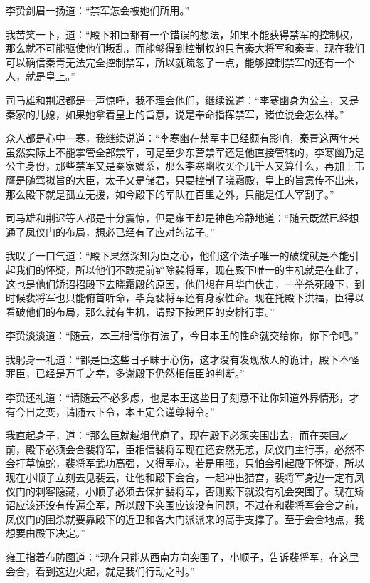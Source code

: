 李贽剑眉一扬道：“禁军怎会被她们所用。”

我苦笑一下，道：“殿下和臣都有一个错误的想法，如果不能获得禁军的控制权，那么就不可能驱使他们叛乱，而能够得到控制权的只有秦大将军和秦青，现在我们可以确信秦青无法完全控制禁军，所以就疏忽了一点，能够控制禁军的还有一个人，就是皇上。”

司马雄和荆迟都是一声惊呼，我不理会他们，继续说道：“李寒幽身为公主，又是秦家的儿媳，如果她拿着皇上的旨意，说是奉命指挥禁军，诸位说会怎么样。”

众人都是心中一寒，我继续说道：“李寒幽在禁军中已经颇有影响，秦青这两年来虽然实际上不能掌管全部禁军，可是至少东营禁军还是他直接管辖的，李寒幽乃是公主身份，那些禁军又是秦家嫡系，那么李寒幽收买个几千人又算什么，再加上韦膺是随驾拟旨的大臣，太子又是储君，只要控制了晓霜殿，皇上的旨意传不出来，那么殿下就是孤立无援，如今殿下的军队在百里之外，只能是任人宰割了。”

司马雄和荆迟等人都是十分震惊，但是雍王却是神色冷静地道：“随云既然已经想通了凤仪门的布局，想必已经有了应对的法子。”

我叹了一口气道：“殿下果然深知为臣之心，他们这个法子唯一的破绽就是不能引起我们的怀疑，所以他们不敢提前铲除裴将军，现在殿下唯一的生机就是在此了，这也是他们矫诏招殿下去晓霜殿的原因，他们想在月华门伏击，一举杀死殿下，到时候裴将军也只能俯首听命，毕竟裴将军还有身家性命。现在托殿下洪福，臣得以看破他们的布局，那么就有生机，请殿下按照臣的安排行事。”

李贽淡淡道：“随云，本王相信你有法子，今日本王的性命就交给你，你下令吧。”

我躬身一礼道：“都是臣这些日子昧于心伤，这才没有发现敌人的诡计，殿下不怪罪臣，已经是万千之幸，多谢殿下仍然相信臣的判断。”

李贽还礼道：“请随云不必多虑，也是本王这些日子刻意不让你知道外界情形，才有今日之变，请随云下令，本王定会谨尊将令。”

我直起身子，道：“那么臣就越俎代庖了，现在殿下必须突围出去，而在突围之前，殿下必须会合裴将军，臣相信裴将军现在还安然无恙，凤仪门主行事，必然不会打草惊蛇，裴将军武功高强，又得军心，若是用强，只怕会引起殿下怀疑，所以现在小顺子立刻去见裴云，让他和殿下会合，一起冲出猎宫，裴将军身边一定有凤仪门的刺客隐藏，小顺子必须去保护裴将军，否则殿下就没有机会突围了。现在矫诏应该还没有传遍全军，所以殿下突围应该没有问题，不过在和裴将军会合之前，凤仪门的围杀就要靠殿下的近卫和各大门派派来的高手支撑了。至于会合地点，我想要由殿下决定。”

雍王指着布防图道：“现在只能从西南方向突围了，小顺子，告诉裴将军，在这里会合，看到这边火起，就是我们行动之时。”

